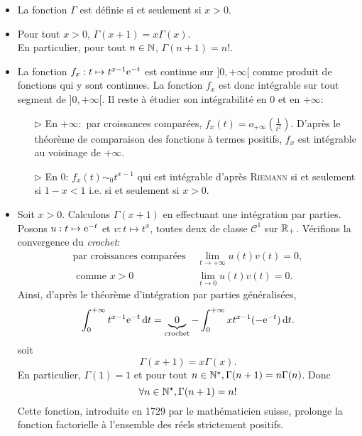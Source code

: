 \begin{prop}
    \begin{itemize}
        \item La fonction $\Gamma$ est définie si et seulement si $x>0$.
        \item Pour tout $x > 0$, $\Gamma(x+1) = x\Gamma(x)$. \\
        En particulier, pour tout $n \in \mathbb{N}$, $\Gamma(n+1) = n!$. 
    \end{itemize}
\end{prop}

\begin{preuve}
    \begin{itemize}
        \item La fonction $f_x:t \mapsto t^{x-1} \mathrm{e}^{-t}$ est continue sur $]0, + \infty[$ comme produit de fonctions qui y sont continues. La fonction $f_x$ est donc intégrable sur tout segment de $]0, +\infty[$. Il reste à étudier son intégrabilité en $0$ et en $+ \infty$:
        \begin{itemize}
            \item[$\triangleright$] En $+\infty:$ par croissances comparées, $f_x(t) = o_{+\infty} \left(\frac{1}{t^2} \right)$. D'après le théorème de comparaison des fonctions à termes positifs, $f_x$ est intégrable au voisinage de $+\infty$.
            \item[$\triangleright$] En $0$: $f_x(t) \sim_0 t^{x-1}$ qui est intégrable d'après \textsc{Riemann} si et seulement si $1-x < 1$ i.e. si et seulement si $x > 0$.
        \end{itemize}

        \item Soit $x > 0$. Calculons $\Gamma(x+1)$ en effectuant une intégration par parties. Posons $u:t \mapsto \mathrm{e}^{-t}$ et $v:t \mapsto t^x$, toutes deux de classe $\mathscr{C}^1$ sur $\mathbb{R}_+$. Vérifions la convergence du \emph{crochet}:
        \begin{align*}
            \text{par croissances comparées } & \lim_{t \to +\infty} u(t) v(t) = 0, \\
            \text{ comme } x > 0 & \lim_{t \to 0} u(t) v(t) = 0.
        \end{align*}
        Ainsi, d'après le théorème d'intégration par parties généralisées, 
        $$\int_{0}^{+\infty} t^{x-1} \mathrm{e}^{-t} \, \mathrm{d} t = \underbrace{0}_{\text{crochet}} - \int_{0}^{+\infty} xt^{x-1} (-\mathrm{e}^{-t}) \, \mathrm{d} t.$$
        soit 
        $$\Gamma(x+1) = x \Gamma(x).$$
        En particulier, $\Gamma(1) = 1$ et pour tout $n \in \mathbb{N}^\star, \Gamma(n+1) = n \Gamma(n)$. Donc
        $$\forall n \in \mathbb{N}^\star, \Gamma(n+1) = n!$$
        Cette fonction, introduite en 1729 par le mathématicien suisse, prolonge la fonction factorielle à l'ensemble des réels strictement positifs.
    \end{itemize}
\end{preuve}

